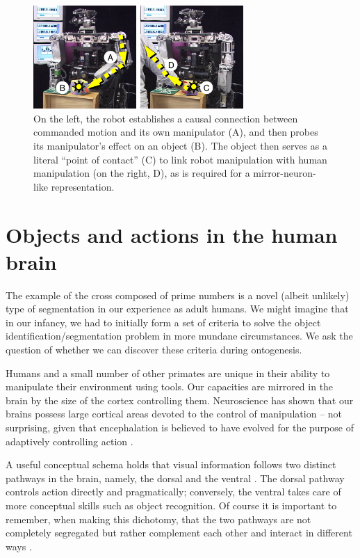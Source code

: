 %
\begin{figure}[tbh]
\begin{center}
\includegraphics[width=8cm]{tracing_causes.eps}
\caption{ 
\label{fig:tracing-causes}
%
On the left, the robot establishes a causal connection between
commanded motion and its own manipulator (A), and then probes its
manipulator's effect on an object (B).  The object then serves as a
literal ``point of contact'' (C) to link robot manipulation with human
manipulation (on the right, D), as is required for a mirror-neuron-like
representation.
%
}
\end{center}
\end{figure}
%

\section{Objects and actions in the human brain}

The example of the cross composed of prime numbers is a novel (albeit
unlikely) type of segmentation in our experience as adult humans. We
might imagine that in our infancy, we had to initially form a set of
criteria to solve the object identification/segmentation problem
in more mundane circumstances.  We ask the question of whether we can
discover these criteria during ontogenesis.

Humans and a small number of other primates are unique in their
ability to manipulate their environment using tools.
Our capacities are mirrored in the brain by the size of
the cortex controlling them.  Neuroscience has shown that our brains
possess large cortical areas devoted to the control of manipulation --
not surprising, given that encephal\iz{}ation is believed to have evolved
for the purpose of adaptively controlling
action \cite{maturana98tree}.

A useful conceptual schema holds that visual information follows two
distinct pathways in the brain, namely, the dorsal and the ventral
\cite{ungerleider82two,milner95visual}.
The dorsal
pathway controls action directly and pragmatically; conversely, the
ventral takes care of more conceptual skills such as object
recognition.
Of course it is important to remember, when making this dichotomy,
that the two pathways are not completely segregated but rather
complement each other and interact in different
ways \cite{jeannerod97cognitive}.

